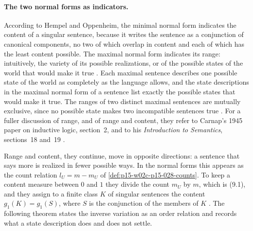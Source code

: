 \paragraph{The two normal forms as indicators.}
According to Hempel and Oppenheim, the minimal normal form indicates the
content of a singular sentence, because it writes the sentence as a
conjunction of canonical components, no two of which overlap in content
and each of which has the least content possible. The maximal normal form indicates its range:
intuitively, the variety of its possible realizations, or of the possible
states of the world that would make it true
\cite[pp.~168--169]{HempelOppenheim1948Explanation}. Each maximal
sentence describes one possible state of the world as completely as the
language allows, and the state descriptions in the maximal normal form of
a sentence list exactly the possible states that would make it true. The
ranges of two distinct maximal sentences are mutually exclusive, since no
possible state makes two incompatible sentences true
\cite[p.~169]{HempelOppenheim1948Explanation}. For a fuller discussion of
range, and of range and content, they refer to Carnap's 1945 paper on
inductive logic, section~2, and to his \emph{Introduction to Semantics},
sections~18 and~19 \cite[p.~169, n.~37]{HempelOppenheim1948Explanation}.

Range and content, they continue, move in opposite directions: a sentence
that says more is realized in fewer possible ways. In the
normal forms this appears as the count relation \(l_U=m-m_U\) of
\cref{def:p15-w02c-p15-028-counts}. To keep a content measure between
\(0\) and \(1\) they divide the count \(m_U\) by \(m\), which is (9.1),
and they assign to a finite class \(K\) of singular sentences the content
\(g_1(K)=g_1(S)\), where \(S\) is the conjunction of the members of
\(K\) \cite[p.~169]{HempelOppenheim1948Explanation}. The following
theorem states the inverse variation as an order relation and records
what a state description does and does not settle.

